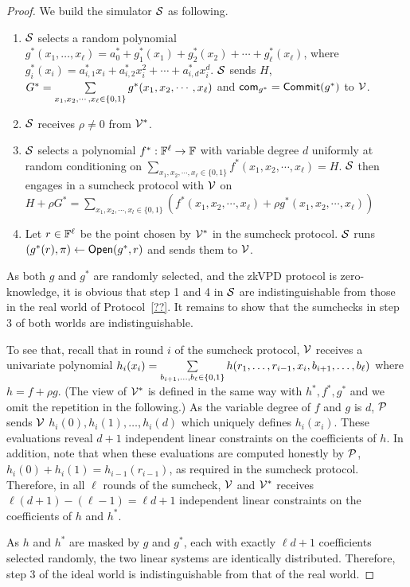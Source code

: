\begin{proof}
	
	We build the simulator $\S$ as following.
	
	\begin{enumerate}
		
		\item $\S$ selects a random polynomial $g^*(x_1,\ldots,x_\ell) = a^*_{0} + g^*_1(x_1) + g^*_2(x_2) + \cdots + g^*_\ell(x_\ell)$, where $g^*_i(x_i) = a^*_{i,1}x_i + a^*_{i,2}x_i^2 + \cdots + a^*_{i,d}x_i^d$. $\S$ sends $H$, $G^* = \sum\limits_{x_1, x_2, \cdots, x_\ell \in \binary} g^*(x_1, x_2, \cdots, x_\ell)$ and $\comm_{g^*} = \Commit(g^*)$ to $\V$.
		
			
		\item $\S$ receives $\rho \neq 0$ from $\V^*$.
		\item $\S$ selects a polynomial $f^*:\F^\ell\rightarrow\F$ with variable degree $d$ uniformly at random conditioning on $\sum\limits_{x_1, x_2, \cdots, x_\ell \in \{0, 1\}}f^*(x_1, x_2, \cdots, x_\ell) = H$. $\S$ then engages in a sumcheck protocol with $\V$ on  $H+\rho G^* = \sum\limits_{x_1, x_2, \cdots, x_l \in \{0, 1\}}(f^*(x_1, x_2, \cdots, x_\ell)+\rho g^*(x_1, x_2, \cdots, x_\ell))$
		
		\item Let $r \in \F^\ell$ be the point chosen by $\V^*$ in the sumcheck protocol. $\S$ runs $(g^*(r), \pi)\leftarrow\Open(g^*,r)$ and sends them to $\V$.
		
	\end{enumerate} 
	
	As both $g$ and $g^*$ are randomly selected, and the zkVPD protocol is zero-knowledge, it is obvious that step 1 and 4 in $\S$ are indistinguishable from those in the real world of Protocol~\ref{??}. It remains to show that the sumchecks in step 3 of both worlds are indistinguishable.
	
	To see that, recall that in round $i$ of the sumcheck protocol, $\V$ receives a univariate polynomial $h_i(x_i) = \sum\limits_{b_{i+1}, \ldots,b_\ell\in\binary}h(r_1, \ldots, r_{i-1},x_i, b_{i+1}, \ldots, b_\ell)$ where $h = f+\rho g$. (The view of $\V^*$ is defined in the same way with $h^*,f^*,g^*$ and we omit the repetition in the following.) As the variable degree of $f$ and $g$ is $d$, $\P$ sends $\V$ $h_i(0), h_i(1), \ldots, h_i(d)$ which uniquely defines $h_i(x_i)$. These evaluations reveal $d+1$ independent linear constraints on the coefficients of $h$. In addition, note that when these evaluations are computed honestly by $\P$, $h_i(0)+h_i(1) = h_{i-1}(r_{i-1})$, as required in the sumcheck protocol. Therefore, in all $\ell$ rounds of the sumcheck, $\V$ and $\V^*$ receives $\ell(d+1) - (\ell-1) = \ell d+1$ independent linear constraints on the coefficients of $h$ and $h^*$. 
	
	As $h$ and $h^*$ are masked by $g$ and $g^*$, each with exactly $\ell d+1$ coefficients selected randomly, the two linear systems are identically distributed. Therefore, step 3 of the ideal world is indistinguishable from that of the real world.
	
\end{proof}



